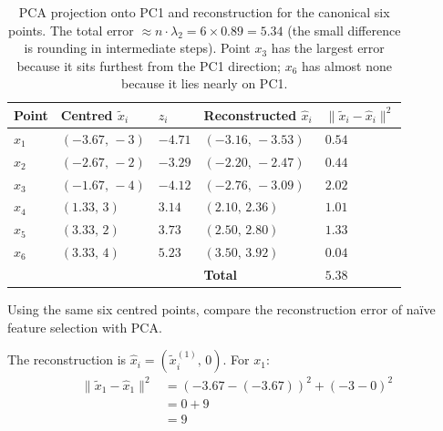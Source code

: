 \begin{table}[ht]
\centering
\begin{tabular}{p{}p{}p{}p{}p{}}
    \toprule
    \textbf{Point} & \textbf{Centred $\tilde{x}_i$} & \textbf{$z_i$} & \textbf{Reconstructed $\hat{x}_i$} & \textbf{$\|\tilde{x}_i - \hat{x}_i\|^2$} \\
    \midrule
    $x_1$ & $(-3.67,\, -3)$   & $-4.71$ & $(-3.16,\, -3.53)$ & $0.54$ \\
    $x_2$ & $(-2.67,\, -2)$   & $-3.29$ & $(-2.20,\, -2.47)$ & $0.44$ \\
    $x_3$ & $(-1.67,\, -4)$   & $-4.12$ & $(-2.76,\, -3.09)$ & $2.02$ \\
    $x_4$ & $(1.33,\, 3)$     & $3.14$  & $(2.10,\, 2.36)$   & $1.01$ \\
    $x_5$ & $(3.33,\, 2)$     & $3.73$  & $(2.50,\, 2.80)$   & $1.33$ \\
    $x_6$ & $(3.33,\, 4)$     & $5.23$  & $(3.50,\, 3.92)$   & $0.04$ \\
    \midrule
    & & & \textbf{Total} & $\mathbf{5.38}$ \\
    \bottomrule
\end{tabular}
\vspace{2em}
\caption{PCA projection onto PC1 and reconstruction for the canonical six points. The total error $\approx n \cdot \lambda_2 = 6 \times 0.89 = 5.34$ (the small difference is rounding in intermediate steps). Point $x_3$ has the largest error because it sits furthest from the PC1 direction; $x_6$ has almost none because it lies nearly on PC1.}
\label{tab:pca_projection_reconstruction}
\end{table}


\vspace{2.5em}


Using the same six centred points, compare the reconstruction error of na\"ive feature selection with PCA.

 The reconstruction is $\hat{x}_i = (\tilde{x}_i^{(1)},\, 0)$.
For $x_1$:
\begin{align*}
    \|\tilde{x}_1 - \hat{x}_1\|^2 &= (-3.67-(-3.67))^2 + (-3-0)^2 \\
                                    &= 0 + 9 \\
                                    &= 9
\end{align*}

